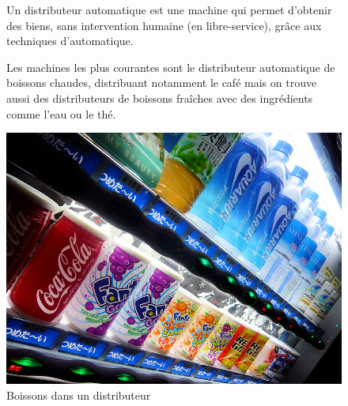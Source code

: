 \begin{figure}[htbp]
\begin{minipage}[c]{.55\linewidth}
Un distributeur automatique est une machine qui permet d'obtenir des biens, sans intervention humaine (en libre-service), grâce aux techniques d'automatique.

Les machines les plus courantes sont le distributeur automatique de boissons chaudes, distribuant notamment le café mais on trouve aussi des distributeurs de boissons fraîches avec des ingrédients comme l'eau ou le thé.
\end{minipage}
\hfill
\begin{minipage}[c]{.40\linewidth}
\begin{center}
\includegraphics[width=0.9\linewidth]{img/Boissons.jpg}
\caption{Boissons dans un distributeur}
\label{fig:image106}
\end{center}
\end{minipage}
\end{figure}

